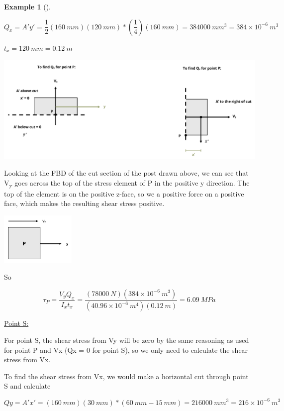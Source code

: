 \documentclass[
  letterpaper,
  DIV=11,
  numbers=noendperiod]{scrreprt}
\theoremstyle{definition}
\newtheorem{example}{Example}[chapter]
\theoremstyle{remark}
\begin{document}
\begin{tcolorbox}
\begin{example}[]
\begin{tcolorbox}
\[
Q_x=A'y'=\frac{1}{2}(160{~mm})(120{~mm})*\left(\frac{1}{4}\right)(160{~mm})=384000{~mm}^3=384 \times 10^{-6}{~m}^3
\]

\(t_x = 120{~mm} = 0.12{~m}\)

\begin{center}
\includegraphics{images/CH14 PNGs/example 14.5 part 3.png}
\end{center}

Looking at the FBD of the cut section of the post drawn above, we can
see that V\textsubscript{y} goes across the top of the stress element of
P in the positive y direction. The top of the element is on the positive
z-face, so we a positive force on a positive face, which makes the
resulting shear stress positive.

\begin{center}
\includegraphics[width=1.41667in,height=\textheight]{images/CH14 PNGs/example 14.5 part 4.png}
\end{center}

So

\[
\tau_P=\frac{V_y Q_x}{I_x t_x}=\frac{(78000{~N})(384 \times 10^{-6}{~m}^3)}{(40.96 \times 10^{-6}{~m}^4)(0.12{~m})}=6.09{~MPa}
\]

\ul{Point S:}

For point S, the shear stress from Vy will be zero by the same reasoning
as used for point P and Vx (Qx = 0 for point S), so we only need to
calculate the shear stress from Vx.

To find the shear stress from Vx, we would make a horizontal cut through
point S and calculate

\[
Q y=A'x'=(160{~mm})(30{~mm})*(60{~mm}-15{~mm})=216000{~mm}^3=216 \times 10^{-6}{~m}^3
\]


\end{tcolorbox}
\end{example}
\end{tcolorbox}
\end{document}
